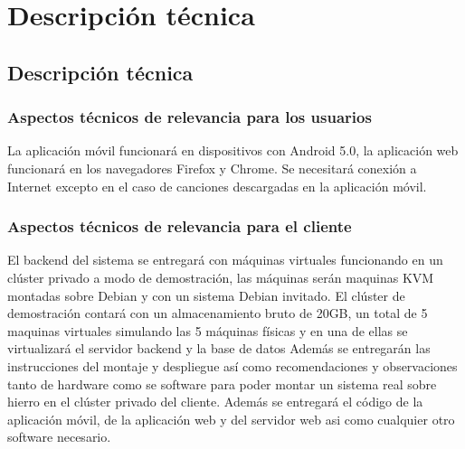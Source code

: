 
\chapter{Descripci\'on t\'ecnica} %

\label{Chapter3} %


\section{Descripci\'on t\'ecnica}

\subsection{Aspectos t\'ecnicos de relevancia para los usuarios}
La aplicaci\'on m\'ovil funcionar\'a en dispositivos con Android 5.0, la aplicaci\'on web funcionar\'a en los navegadores Firefox y Chrome. Se necesitar\'a conexi\'on a Internet excepto en el caso de canciones descargadas en la aplicaci\'on m\'ovil. 
\subsection{Aspectos t\'ecnicos de relevancia para el cliente}
El backend del sistema se entregar\'a con m\'aquinas virtuales funcionando en un cl\'uster privado a modo de demostraci\'on, las m\'aquinas ser\'an maquinas KVM montadas sobre Debian y con un sistema Debian invitado. El cl\'uster de demostraci\'on contar\'a con un almacenamiento bruto de 20GB, un total de 5 maquinas virtuales simulando las 5 m\'aquinas f\'isicas y en una de ellas se virtualizar\'a el servidor backend y la base de datos
Adem\'as se entregar\'an las instrucciones del montaje y despliegue as\'i como recomendaciones y observaciones tanto de hardware como se software para poder montar un sistema real sobre hierro en el cl\'uster privado del cliente.
Adem\'as se entregar\'a el c\'odigo de la aplicaci\'on m\'ovil, de la aplicaci\'on web y del servidor web asi como cualquier otro software necesario.

